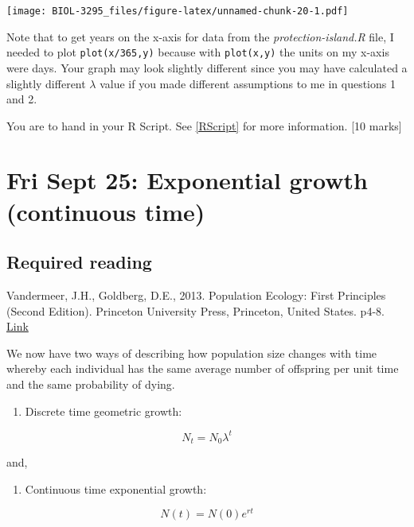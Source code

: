 \documentclass[]{book}
\providecommand{\tightlist}{%
  \setlength{\itemsep}{0pt}\setlength{\parskip}{0pt}}
\begin{document}
\texttt{[image: BIOL-3295\_files/figure-latex/unnamed-chunk-20-1.pdf]}

Note that to get years on the x-axis for data from the
\emph{protection-island.R} file, I needed to plot \texttt{plot(x/365,y)}
because with \texttt{plot(x,y)} the units on my x-axis were days. Your
graph may look slightly different since you may have calculated a
slightly different \(\lambda\) value if you made different assumptions
to me in questions 1 and 2.

You are to hand in your R Script. See \ref{RScript} for more
information. {[}10 marks{]}

\chapter{Fri Sept 25: Exponential growth (continuous
time)}\label{fri-sept-25-exponential-growth-continuous-time}

\section{Required reading}\label{required-reading-2}

Vandermeer, J.H., Goldberg, D.E., 2013. Population Ecology: First
Principles (Second Edition). Princeton University Press, Princeton,
United States. p4-8.
\href{https://ebookcentral-proquest-com.qe2a-proxy.mun.ca/lib/mun/detail.action?docID=1205619}{Link}

We now have two ways of describing how population size changes with time
whereby each individual has the same average number of offspring per
unit time and the same probability of dying.

\begin{enumerate}
\def\labelenumi{\arabic{enumi})}
\tightlist
\item
  Discrete time geometric growth:
\end{enumerate}

\begin{equation}
N_t = N_0\lambda^t
\label{eq:Geo}
\end{equation}

and,

\begin{enumerate}
\def\labelenumi{\arabic{enumi})}
\setcounter{enumi}{1}
\tightlist
\item
  Continuous time exponential growth:
\end{enumerate}

\begin{equation}
N(t) = N(0)e^{rt}
\label{eq:Exp}
\end{equation}
\end{document}
